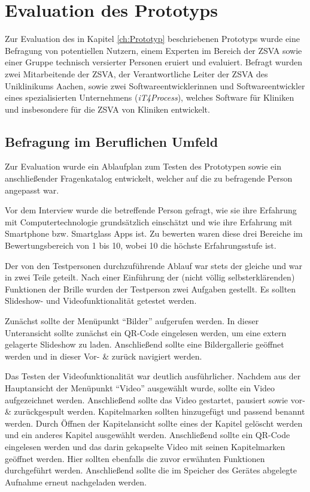 %
%
%
%
%
%
\chapter{Evaluation des Prototyps}
\label{ch:Evaluation_des_Prototyps}
Zur Evaluation des in Kapitel \ref{ch:Prototyp} beschriebenen Prototyps wurde eine Befragung von potentiellen Nutzern, einem Experten im Bereich der ZSVA sowie einer Gruppe technisch versierter Personen eruiert und evaluiert. Befragt wurden zwei
Mitarbeitende der ZSVA, 
der Verantwortliche Leiter der ZSVA des Uniklinikums Aachen, 
sowie zwei Softwareentwicklerinnen und Softwareentwickler eines spezialisierten Unternehmens (\emph{iT4Process}), welches Software für Kliniken und insbesondere für die ZSVA von Kliniken entwickelt.
%
%
%
%
%
%
%
%
\section{Befragung im Beruflichen Umfeld}
\label{sec:Befragung_im_Beruflichen_Umfeld}
Zur Evaluation wurde ein Ablaufplan zum Testen des Prototypen sowie ein anschließender Fragenkatalog entwickelt, welcher auf die zu befragende Person angepasst war. 

Vor dem Interview wurde die betreffende Person gefragt, wie sie ihre Erfahrung mit Computertechnologie grundsätzlich einschätzt und wie ihre Erfahrung mit Smartphone bzw. Smartglass Apps ist. Zu bewerten waren diese drei Bereiche im Bewertungsbereich von 1 bis 10, wobei 10 die höchste Erfahrungsstufe ist.

Der von den Testpersonen durchzuführende Ablauf war stets der gleiche und war in zwei Teile geteilt. Nach einer Einführung der (nicht völlig selbsterklärenden) Funktionen der Brille wurden der Testperson zwei Aufgaben gestellt. Es sollten Slideshow- und Videofunktionalität getestet werden. 

Zunächst sollte der Menüpunkt \enquote{Bilder} aufgerufen werden. In dieser Unteransicht sollte zunächst ein QR-Code eingelesen werden, um eine extern gelagerte Slideshow zu laden. Anschließend sollte eine Bildergallerie geöffnet werden und in dieser Vor- \& zurück navigiert werden.

Das Testen der Videofunktionalität war deutlich ausführlicher. Nachdem aus der Hauptansicht der Menüpunkt \enquote{Video} ausgewählt wurde, sollte ein Video aufgezeichnet werden. Anschließend sollte das Video gestartet, pausiert sowie vor- \& zurückgespult werden. Kapitelmarken sollten hinzugefügt und passend benannt werden. Durch Öffnen der Kapitelansicht sollte eines der Kapitel gelöscht werden und ein anderes Kapitel ausgewählt werden. Anschließend sollte ein QR-Code eingelesen werden und das darin gekapselte Video mit seinen Kapitelmarken geöffnet werden. Hier sollten ebenfalls die zuvor erwähnten Funktionen durchgeführt werden. Anschließend sollte die im Speicher des Gerätes abgelegte Aufnahme erneut nachgeladen werden.

